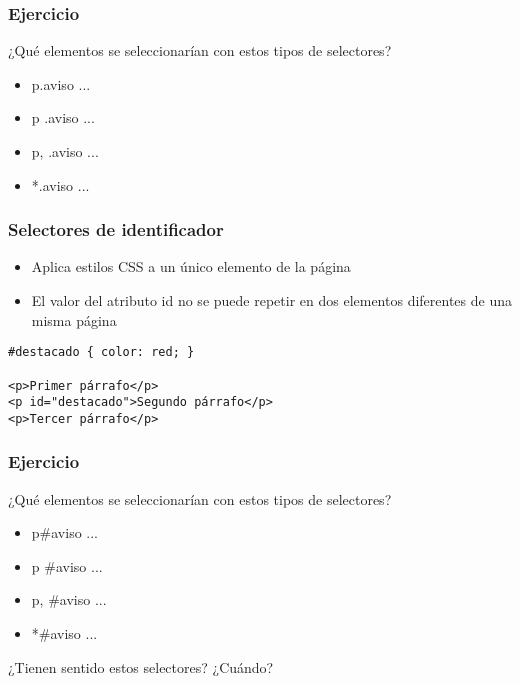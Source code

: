 
\begin{frame}
\frametitle{Ejercicio}

¿Qué elementos se seleccionarían con estos tipos de selectores?

\begin{itemize}
  \item p.aviso { ... }
  \item p .aviso { ... }
  \item p, .aviso { ... }
  \item *.aviso { ... }
\end{itemize}

\end{frame}


\begin{frame}[fragile]
\frametitle{Selectores de identificador}

\begin{itemize}
  \item Aplica estilos CSS a un único elemento de la página
  \item El valor del atributo id no se puede repetir en dos elementos diferentes de una misma página
\end{itemize}

\begin{verbatim}
#destacado { color: red; }
 
<p>Primer párrafo</p>
<p id="destacado">Segundo párrafo</p>
<p>Tercer párrafo</p>
\end{verbatim}

\end{frame}



\begin{frame}
\frametitle{Ejercicio}

¿Qué elementos se seleccionarían con estos tipos de selectores?

\begin{itemize}
  \item p\#aviso { ... }
  \item p \#aviso { ... }
  \item p, \#aviso { ... }
  \item *\#aviso { ... }
\end{itemize}

¿Tienen sentido estos selectores? ¿Cuándo?

\end{frame}

